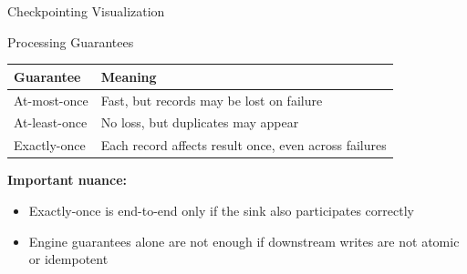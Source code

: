\documentclass[aspectratio=169]{beamer}
\begin{document}
\begin{frame}{Checkpointing Visualization}
\begin{center}
\end{center}
\end{frame}

\begin{frame}{Processing Guarantees}
\begin{table}
\centering
\small
\begin{tabular}{>{\raggedright\arraybackslash}p{2.7cm} >{\raggedright\arraybackslash}p{7.5cm}}
\toprule
Guarantee & Meaning \\
\midrule
At-most-once & Fast, but records may be lost on failure \\
At-least-once & No loss, but duplicates may appear \\
Exactly-once & Each record affects result once, even across failures \\
\bottomrule
\end{tabular}
\end{table}

\vspace{0.3cm}
\textbf{Important nuance:}
\begin{itemize}
    \item Exactly-once is end-to-end only if the sink also participates correctly
    \item Engine guarantees alone are not enough if downstream writes are not atomic or idempotent
\end{itemize}
\end{frame}
\end{document}
